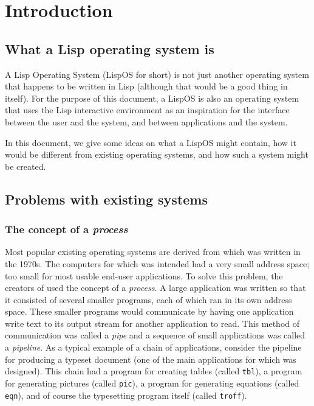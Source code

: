 \chapter{Introduction}

\section{What a Lisp operating system is}

A Lisp Operating System (LispOS for short) is not just another
operating system that happens to be written in Lisp (although that
would be a good thing in itself).  For the purpose of this document, a
LispOS is also an operating system that uses the Lisp interactive
environment as an inspiration for the interface between the user and
the system, and between applications and the system.

In this document, we give some ideas on what a LispOS might contain,
how it would be different from existing operating systems, and how
such a system might be created.

\section{Problems with existing systems}

\subsection{The concept of a \emph{process}}

Most popular existing operating systems are derived from \unix{} which
was written in the 1970s.  The computers for which \unix{} was intended
had a very small address space; too small for most usable end-user
applications.  To solve this problem, the creators of \unix{} used the
concept of a \emph{process}.  A large application was written so
that it consisted of several smaller programs, each of which ran in
its own address space.  These smaller programs would communicate by
having one application write text to its output stream for another
application to read.  This method of communication was called
a \emph{pipe} and a sequence of small applications was called
a \emph{pipeline}.  As a typical example of a chain of applications,
consider the pipeline for producing a typeset document (one of the
main applications for which \unix{} was designed).  This chain had a
program for creating tables (called \texttt{tbl}), a program for
generating pictures (called \texttt{pic}), a program for generating
equations (called \texttt{eqn}), and of course the typesetting program
itself (called \texttt{troff}).

